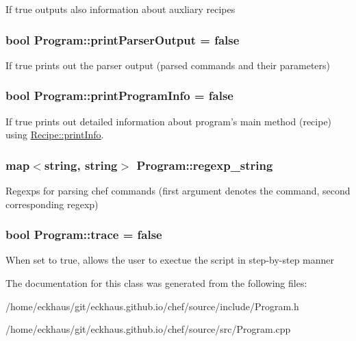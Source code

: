 If true outputs also information about auxliary recipes \hypertarget{classProgram_a3787a8712d4c75b6b5f0e81a5e4f6fdc}{
\subsubsection[{print\-Parser\-Output}]{\setlength{\rightskip}{0pt plus 5cm}bool Program\-::print\-Parser\-Output = false\hspace{0.3cm}{\ttfamily [private]}}}\label{classProgram_a3787a8712d4c75b6b5f0e81a5e4f6fdc}
If true prints out the parser output (parsed commands and their parameters) \hypertarget{classProgram_a4addd74ec821dc25e804fa2096b7fa59}{
\subsubsection[{print\-Program\-Info}]{\setlength{\rightskip}{0pt plus 5cm}bool Program\-::print\-Program\-Info = false\hspace{0.3cm}{\ttfamily [private]}}}\label{classProgram_a4addd74ec821dc25e804fa2096b7fa59}
If true prints out detailed information about program's main method (recipe) using \hyperlink{classRecipe_aa9a086810c68a0f459f3eded4fec249d}{Recipe\-::print\-Info}. \hypertarget{classProgram_af2653e6c49451f67e7365c218eaab08a}{
\subsubsection[{regexp\-\_\-string}]{\setlength{\rightskip}{0pt plus 5cm}map$<$string, string$>$ Program\-::regexp\-\_\-string\hspace{0.3cm}{\ttfamily [private]}}}\label{classProgram_af2653e6c49451f67e7365c218eaab08a}
Regexps for parsing chef commands (first argument denotes the command, second corresponding regexp) \hypertarget{classProgram_a5f4a3688d83bf77b92e294933671007c}{
\subsubsection[{trace}]{\setlength{\rightskip}{0pt plus 5cm}bool Program\-::trace = false\hspace{0.3cm}{\ttfamily [private]}}}\label{classProgram_a5f4a3688d83bf77b92e294933671007c}
When set to true, allows the user to exectue the script in step-\/by-\/step manner 

The documentation for this class was generated from the following files\-:\begin{DoxyCompactItemize}
\item 
/home/eckhaus/git/eckhaus.\-github.\-io/chef/source/include/Program.\-h\item 
/home/eckhaus/git/eckhaus.\-github.\-io/chef/source/src/Program.\-cpp\end{DoxyCompactItemize}

